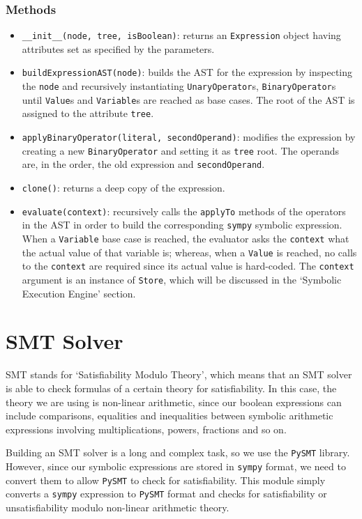 \documentclass[12pt,a4paper]{report}
\theoremstyle{definition}
\theoremstyle{definition}
\theoremstyle{definition}
\begin{document}
\pagebreak

\subsubsection{Methods}
\begin{itemize}
    \itemsep 0em
    \item \texttt{\_\_init\_\_(node, tree, isBoolean)}: returns an \texttt{Expression} object having attributes set as specified by the parameters.
    \item \texttt{buildExpressionAST(node)}: builds the AST for the expression by inspecting the \texttt{node} and recursively instantiating \texttt{UnaryOperator}s, \texttt{BinaryOperator}s until \texttt{Value}s and \texttt{Variable}s are reached as base cases. The root of the AST is assigned to the attribute \texttt{tree}.
    \item \texttt{applyBinaryOperator(literal, secondOperand)}: modifies the expression by creating a new \texttt{BinaryOperator} and setting it as \texttt{tree} root. The operands are, in the order, the old expression and \texttt{secondOperand}.
    \item \texttt{clone()}: returns a deep copy of the expression.
    \item \texttt{evaluate(context)}: recursively calls the \texttt{applyTo} methods of the operators in the AST in order to build the corresponding \texttt{sympy} symbolic expression. When a \texttt{Variable} base case is reached, the evaluator asks the \texttt{context} what the actual value of that variable is; whereas, when a \texttt{Value} is reached, no calls to the \texttt{context} are required since its actual value is hard-coded. The \texttt{context} argument is an instance of \texttt{Store}, which will be discussed in the `Symbolic Execution Engine' section.
\end{itemize}


\section{SMT Solver}
SMT stands for `Satisfiability Modulo Theory', which means that an SMT solver is able to check formulas of a certain theory for satisfiability. In this case, the theory we are using is non-linear arithmetic, since our boolean expressions can include comparisons, equalities and inequalities between symbolic arithmetic expressions involving multiplications, powers, fractions and so on.

Building an SMT solver is a long and complex task, so we use the \texttt{PySMT} library. However, since our symbolic expressions are stored in \texttt{sympy} format, we need to convert them to allow \texttt{PySMT} to check for satisfiability.
This module simply converts a \texttt{sympy} expression to \texttt{PySMT} format and checks for satisfiability or unsatisfiability modulo non-linear arithmetic theory.
\end{document}
